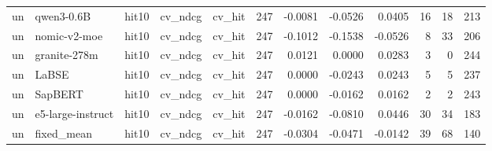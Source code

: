 \begin{tabular}{lllllrrrrrrr}
un & qwen3-0.6B & hit10 & cv\_ndcg & cv\_hit & 247 & -0.0081 & -0.0526 & 0.0405 & 16 & 18 & 213 \\
un & nomic-v2-moe & hit10 & cv\_ndcg & cv\_hit & 247 & -0.1012 & -0.1538 & -0.0526 & 8 & 33 & 206 \\
un & granite-278m & hit10 & cv\_ndcg & cv\_hit & 247 & 0.0121 & 0.0000 & 0.0283 & 3 & 0 & 244 \\
un & LaBSE & hit10 & cv\_ndcg & cv\_hit & 247 & 0.0000 & -0.0243 & 0.0243 & 5 & 5 & 237 \\
un & SapBERT & hit10 & cv\_ndcg & cv\_hit & 247 & 0.0000 & -0.0162 & 0.0162 & 2 & 2 & 243 \\
un & e5-large-instruct & hit10 & cv\_ndcg & cv\_hit & 247 & -0.0162 & -0.0810 & 0.0446 & 30 & 34 & 183 \\
un & fixed\_mean & hit10 & cv\_ndcg & cv\_hit & 247 & -0.0304 & -0.0471 & -0.0142 & 39 & 68 & 140 \\
\bottomrule
\end{tabular}
